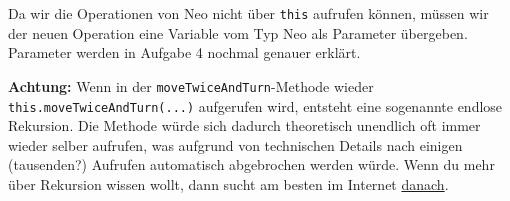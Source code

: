\begin{Infobox}
	Da wir die Operationen von Neo nicht über \lstinline{this} aufrufen können, müssen wir der neuen Operation eine Variable vom Typ Neo als Parameter übergeben.
	Parameter werden in Aufgabe 4 nochmal genauer erklärt.\newline

	\textbf{Achtung:} Wenn in der \lstinline{moveTwiceAndTurn}-Methode wieder \lstinline{this.moveTwiceAndTurn(...)} aufgerufen wird, entsteht eine sogenannte endlose Rekursion.
	Die Methode würde sich dadurch theoretisch unendlich oft immer wieder selber aufrufen, was aufgrund von technischen Details nach einigen (tausenden?) Aufrufen automatisch abgebrochen werden würde.
	Wenn du mehr über Rekursion wissen wollt, dann sucht am besten im Internet \href{https://www.google.de/search?q=recursion}{danach}.

\end{Infobox}


